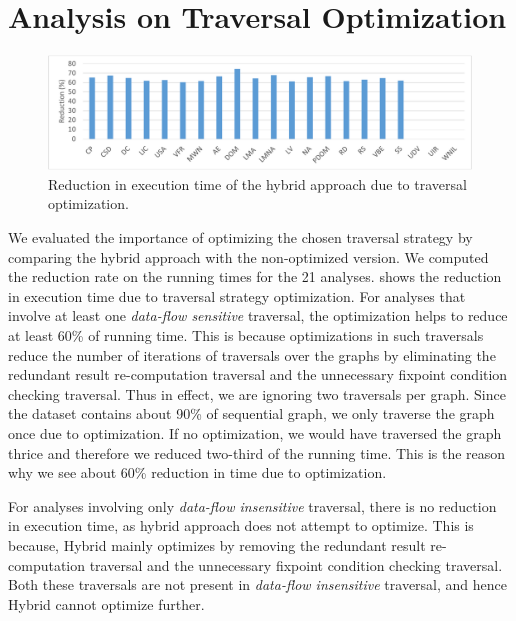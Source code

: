\chapter{Analysis on Traversal Optimization}
\label{sec:analysis-traversal-opt}

\begin{figure}
\centering
\includegraphics[width=\linewidth]{figures/hybrid-optimization}
\caption{Reduction in execution time of the hybrid approach due to traversal optimization.}%
\label{fig:hy-opt-off}%
\end{figure}

We evaluated the importance of optimizing the chosen traversal strategy by 
comparing the hybrid approach with the non-optimized version. We computed 
the reduction rate on the running times for the 21 analyses. 
 shows the reduction in execution time due to 
traversal strategy optimization. For analyses that involve at least one 
\textit{data-flow sensitive} traversal, the optimization helps to reduce at 
least 60\% of running time. This is because optimizations in such traversals 
reduce the number of iterations of traversals over the graphs by eliminating 
the redundant result re-computation traversal and the
unnecessary fixpoint condition checking traversal. Thus in effect, we are ignoring two traversals per graph. Since the dataset contains about 90\% of sequential graph, we only traverse the graph once due to optimization. If no optimization, we would have traversed the graph thrice and therefore we reduced two-third of the running time. This is the reason why we see about 60\% reduction in time due to optimization.
 
For analyses involving only 
\textit{data-flow insensitive} traversal, there is no reduction in execution time, as 
hybrid approach does not attempt to optimize. This is because, Hybrid mainly optimizes by removing the redundant result re-computation traversal and the
unnecessary fixpoint condition checking traversal. Both these traversals are not present in \textit{data-flow insensitive} traversal, and hence Hybrid cannot optimize further.


